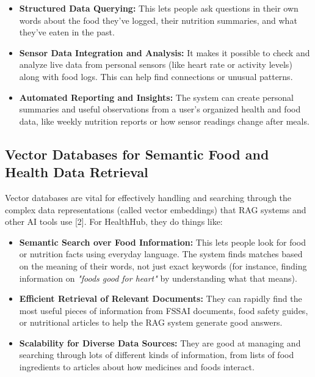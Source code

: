 \begin{itemize}
    \item \textbf{Structured Data Querying:} This lets people ask questions in their own words about the food they've logged, their nutrition summaries, and what they've eaten in the past.
    \item \textbf{Sensor Data Integration and Analysis:} It makes it possible to check and analyze live data from personal sensors (like heart rate or activity levels) along with food logs. This can help find connections or unusual patterns.
    \item \textbf{Automated Reporting and Insights:} The system can create personal summaries and useful observations from a user's organized health and food data, like weekly nutrition reports or how sensor readings change after meals.
\end{itemize}

\subsection{Vector Databases for Semantic Food and Health Data Retrieval}
Vector databases are vital for effectively handling and searching through the complex data representations (called vector embeddings) that RAG systems and other AI tools use [2]. For HealthHub, they do things like:

\begin{itemize}
    \item \textbf{Semantic Search over Food Information:} This lets people look for food or nutrition facts using everyday language. The system finds matches based on the meaning of their words, not just exact keywords (for instance, finding information on \textit{"foods good for heart"} by understanding what that means).
    \item \textbf{Efficient Retrieval of Relevant Documents:} They can rapidly find the most useful pieces of information from FSSAI documents, food safety guides, or nutritional articles to help the RAG system generate good answers.
    \item \textbf{Scalability for Diverse Data Sources:} They are good at managing and searching through lots of different kinds of information, from lists of food ingredients to articles about how medicines and foods interact.
\end{itemize}

